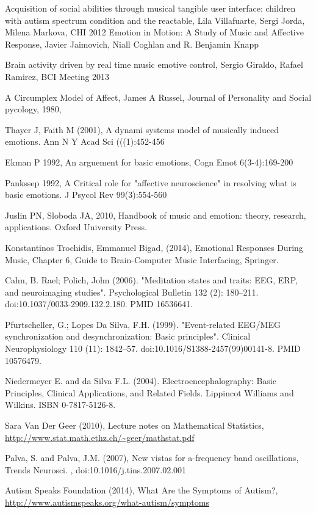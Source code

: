 \documentclass[twocolumn,superscriptaddress]{revtex4-1}
\theoremstyle{definition}
\theoremstyle{remark}
\begin{document}
\begin{thebibliography}{}

 Acquisition of social abilities through musical tangible user interface: children with autism spectrum  condition and the reactable, Lila Villafuarte, Sergi Jorda, Milena Markova, CHI 2012
 Emotion in Motion:
A Study of Music and Affective Response, Javier Jaimovich, Niall Coghlan and R. Benjamin Knapp

 Brain activity driven by real time music emotive control, Sergio Giraldo, Rafael Ramirez, BCI Meeting 2013

 A Circumplex Model of Affect, James A Russel, Journal of Personality and Social pycology, 1980, 

 Thayer J, Faith M (2001), A dynami systems model of musically induced emotions. Ann N Y Acad Sci (((1):452-456

 Ekman P 1992, An arguement for basic emotions, Cogn Emot 6(3-4):169-200

 Pankssep 1992, A Critical role for "affective neuroscience" in resolving what is basic emotions. J Psycol Rev 99(3):554-560

 Juslin PN, Sloboda JA, 2010, Handbook of music and emotion: theory, research, applications. Oxford University Press.


 Konstantinos Trochidis, Emmanuel Bigad, (2014), Emotional Responses During Music, Chapter 6, Guide to Brain-Computer Music Interfacing, Springer.


  Cahn, B. Rael; Polich, John (2006). "Meditation states and traits: EEG, ERP, and neuroimaging studies". Psychological Bulletin 132 (2): 180–211. doi:10.1037/0033-2909.132.2.180. PMID 16536641.


 Pfurtscheller, G.; Lopes Da Silva, F.H. (1999). "Event-related EEG/MEG synchronization and desynchronization: Basic principles". Clinical Neurophysiology 110 (11): 1842–57. doi:10.1016/S1388-2457(99)00141-8. PMID 10576479.


 Niedermeyer E. and da Silva F.L. (2004). Electroencephalography: Basic Principles, Clinical Applications, and Related Fields. Lippincot Williams and Wilkins. ISBN 0-7817-5126-8.

 Sara Van Der Geer (2010), Lecture notes on Mathematical Statistics, \url{http://www.stat.math.ethz.ch/~geer/mathstat.pdf}

 Palva, S. and Palva, J.M. (2007), New vistas for a-frequency band oscillations, Trends Neurosci. , doi:10.1016/j.tins.2007.02.001

 Autism Speaks Foundation (2014),  What Are the Symptoms of Autism?, \url{http://www.autismspeaks.org/what-autism/symptoms}

\end{thebibliography}
\end{document}
